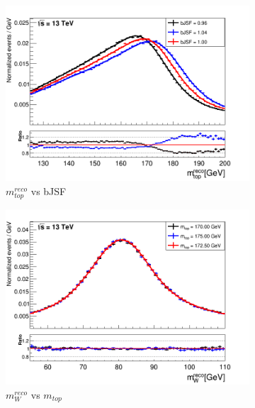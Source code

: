 \begin{landscape}
\begin{figure}
	\hspace*{0.25cm}
	\begin{subfigure}{0.37\textwidth}
	\includegraphics[width=\linewidth]{Pics/PlotCombi/mtop_bJSF.png}
	\caption{$m_{top}^{reco}$ vs bJSF} \label{fig:mtopbJSF}
	\end{subfigure}
	\begin{subfigure}{0.37\textwidth}
	\includegraphics[width=\linewidth]{Pics/PlotCombi/mw_mtop.png}
	\caption{$m_{W}^{reco}$ vs $m_{top}$} \label{fig:mwmtop}
	\end{subfigure}
	\hspace*{0.25cm}
	\begin{subfigure}{0.37\textwidth}

\end{subfigure}
\end{figure}
\end{landscape}
